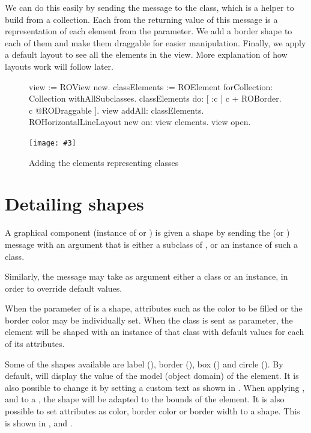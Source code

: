 \documentclass[a4paper,10pt,twoside]{book}
\newcommand{\fig}[4]{
		\begin{figure}[#1]
			\centering
			\texttt{[image: \#3]}
			\caption{\label{fig:#3}#4}
		\end{figure}}
\begin{document}
We can do this easily by sending the  message to the  class, which is a helper to build  from a collection. 
Each  from the returning value of this message is a representation of each element from the parameter. 
We add a border shape to each of them and make them draggable for easier manipulation.
Finally, we apply a default layout to see all the elements in the view. 
More explanation of how layouts work will follow later.


\begin{figure}[H]
\begin{code}{}
view := ROView new.
classElements := ROElement forCollection: Collection withAllSubclasses.
classElements 
	do: [ :c | c + ROBorder.
			c @RODraggable ].
view addAll: classElements.
ROHorizontalLineLayout new on: view elements.
view open.
\end{code}
\end{figure}

\fig{H}{0.6}{hier1}{Adding the elements representing classes}


\section{Detailing shapes} 

A graphical component (instance of  or ) is given a shape by sending the \ct{+} (or ) message with an argument that is either a subclass of , or an instance of such a class.

Similarly, the  message may take as argument either a class or an instance, in order to override default values.

When the parameter of \ct{+} is a shape, attributes such as the color to be filled or the border color may be individually set. When the class is sent as parameter, the element will be shaped with an instance of that class with default values for each of its attributes.

Some of the shapes available are label (), border (), box () and circle (). By default,  will display the  value of the model (\ie object domain) of the element. It is also possible to change it by setting a custom text as shown in . When applying ,  and  to a , the shape will be adapted to the bounds of the element. It is also possible to set attributes as color, border color or border width to a shape. This is shown in ,  and .
\end{document}
